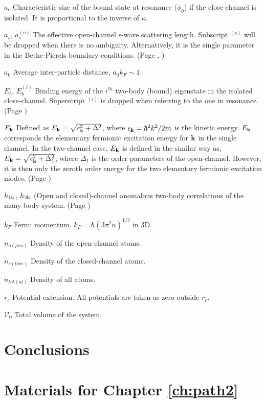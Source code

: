 \documentclass[edeposit,fullpage,prequest,10pt]{uiucthesis2009}
\begin{document}
\begin{symbollist}[0.7in]
\item[$a_{c}$] Characteristic size of the bound state at resonance ($\phi_{0}$) if the close-channel is isolated. It is proportional  to the inverse of $\kappa$.
\item[$a_{s}$, $a_{s}^{(o)}$] The effective open-channel s-wave scattering length. Subscript ${}^{(o)}$ will be dropped when there is no ambiguity. Alternatively, it is  the single parameter in  the Bethe-Pierels boundary conditions. (Page \pageref{sec:intro:as}, \pageref{eq:intro:asK})
\item[$a_{0}$] Average inter-particle distance, $a_{0}k_{F}\sim1$.
\item[$E_{b}$, $E_{b}^{(i)}$] Binding energy of the $i^{th}$ two-body (bound) eigenstate in the isolated close-channel.  Superscript ${}^{(i)}$ is dropped when referring to the one in resonance. (Page \pageref{eq:intro:sch2})
\item[$E_{\mathbf{k}}$] Defined as $E_{\mathbf{k}}=\sqrt{\epsilon_{\mathbf{k}}^{2}+\Delta^{2}}$, where $\epsilon_{\mathbf{k}}=\hbar^{2}k^{2}/2m$ is the kinetic energy. $E_{\mathbf{k}}$ corresponds the elementary fermionic excitation energy for $\mathbf{k}$ in the single channel.   In the two-channel case, $E_{\mathbf{k}}$ is defined in the similar way as, $E_{\mathbf{k}}=\sqrt{\epsilon_{\mathbf{k}}^{2}+\Delta_{1}^{2}}$, where $\Delta_1$ is the order parameters of the open-channel. However, it is then only the zeroth order   energy for the two elementary fermionic excitation modes. (Page \pageref{eq:pathInt:G0})



\item[$h_{1\mathbf{k}}$, $ h_{2\mathbf{k}}$] (Open and closed)-channel anomalous two-body correlations of the many-body system. (Page \pageref{eq:pathInt2:h2})
\item[$k_{F}$] Fermi momentum. $k_{F}=\hbar(3\pi^{2}n)^{1/3}$ in 3D.

\item[$n_{o(pen)}$] Density of the open-channel atoms.
\item[ $n_{c(lose)}$] Density of the  closed-channel atoms.
\item[ $n_{tot(al)}$] Density of all atoms.
\item[$r_{c}$] Potential extension.  All  potentials are taken as zero outside $r_{c}$. 
\item[$\mathcal{V}_{0}$]  Total volume of the system. 

\end{symbollist}

\mainmatter




\chapter{Conclusions\label{ch:conclusion}}


\appendix

%

\chapter{Materials for Chapter \ref{ch:path2}}


\backmatter



\end{document}
